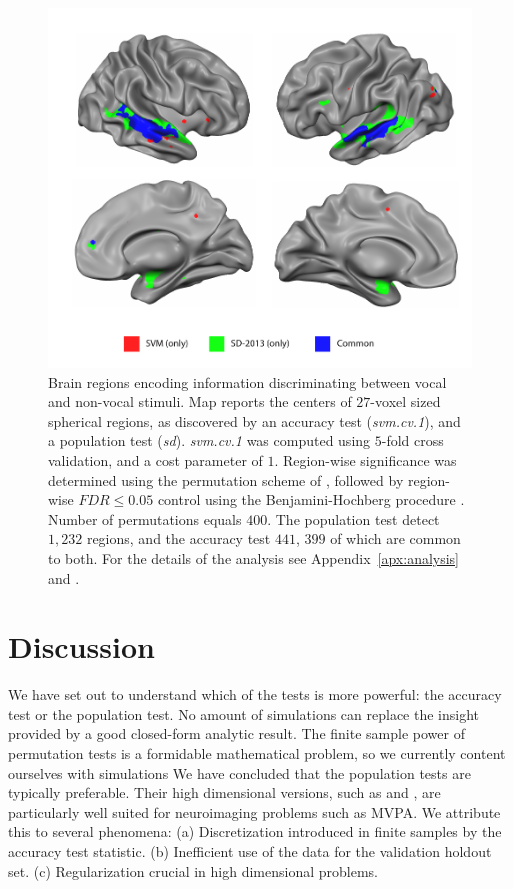 \documentclass[12pt,a4paper]{article}
\theoremstyle{definition}
\begin{document}
\begin{figure}[th]
\centering
\includegraphics[width=0.7\linewidth]{"art/svm_vs_SD"}
\caption{\footnotesize
Brain regions encoding information discriminating between vocal and non-vocal stimuli.
Map reports the centers of $27$-voxel sized spherical regions, as discovered by an accuracy test (\emph{svm.cv.1}), and a population test (\emph{sd}). 
\emph{svm.cv.1} was computed using $5$-fold cross validation, and a cost parameter of $1$. 
Region-wise significance was determined using the permutation scheme of \cite{stelzer_statistical_2013}, followed by region-wise $FDR \leq 0.05$ control using the Benjamini-Hochberg procedure \citep{benjamini_controlling_1995}.
Number of permutations equals $400$.
The population test detect $1,232$ regions, and the accuracy test $441$, $399$ of which are common to both.
For the details of the analysis see Appendix~\ref{apx:analysis} and \cite{gilron_quantifying_2016}.  
  }
\label{fig:read_data}
\end{figure}








\section{Discussion}
\label{sec:discussion}

We have set out to understand which of the tests is more powerful: the accuracy test or the population test. 
No amount of simulations can replace the insight provided by a good closed-form analytic result. 
The finite sample power of permutation tests is a formidable mathematical problem, so we currently content ourselves with simulations 
We have concluded that the population tests are typically preferable. 
Their high dimensional versions, such as \cite{srivastava_multivariate_2007} and \cite{schafer_shrinkage_2005},  are particularly well suited for neuroimaging problems such as MVPA.
We attribute this to several phenomena: 
(a) Discretization introduced in finite samples by the accuracy test statistic. 
(b) Inefficient use of the data for the validation holdout set. 
(c) Regularization crucial in high dimensional problems.
\end{document}
